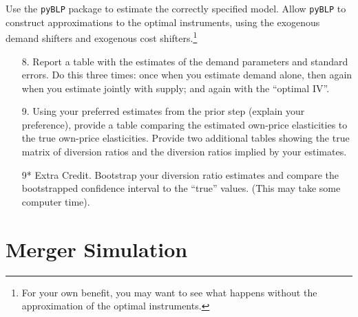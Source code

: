 \documentclass[english,11pt]{article}
\begin{document}
Use the \texttt{pyBLP} package to estimate the correctly specified model. Allow
\texttt{pyBLP} to construct approximations to the optimal instruments, using the
exogenous demand shifters and exogenous cost shifters.\footnote{%
For your own benefit, you may want to see what happens without the
approximation of the optimal instruments.} 

\begin{enumerate}
\item[8.] Report a table with the estimates of the demand
parameters and standard errors. Do this three times: once when you estimate demand
alone, then again when you estimate jointly with supply; and again with the ``optimal IV''.

\item[9.] Using your preferred estimates from the prior step (explain your
preference), provide a table comparing the estimated own-price elasticities
to the true own-price elasticities. Provide two additional tables showing
the true matrix of diversion ratios and the diversion ratios implied by your
estimates.

\item[9*] Extra Credit. Bootstrap your diversion ratio estimates and compare the bootstrapped confidence interval to the ``true'' values. (This may take some computer time).
\end{enumerate}

\section{Merger Simulation}
\end{document}
